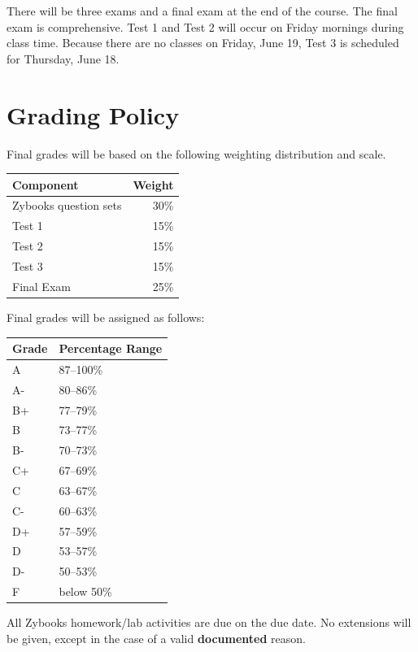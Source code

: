 \documentclass[11pt]{article}
\begin{document}
There will be three exams and a final exam at the end of the course. The final exam is comprehensive. Test 1 and Test 2 will occur on Friday mornings during class time. Because there are no classes on Friday, June 19, Test 3 is scheduled for Thursday, June 18.

\section{Grading Policy}

Final grades will be based on the following weighting distribution and scale.

\begin{center}
\begin{tabular}{@{}lr@{}}
\toprule
\textbf{Component} & \textbf{Weight} \\
\midrule
Zybooks question sets & 30\% \\
Test 1 & 15\% \\
Test 2 & 15\% \\
Test 3 & 15\% \\
Final Exam & 25\% \\
\bottomrule
\end{tabular}
\end{center}

Final grades will be assigned as follows:

\begin{center}
\begin{tabular}{@{}ll@{}}
\toprule
\textbf{Grade} & \textbf{Percentage Range} \\
\midrule
A & 87--100\% \\
A- & 80--86\% \\
B+ & 77--79\% \\
B & 73--77\% \\
B- & 70--73\% \\
C+ & 67--69\% \\
C & 63--67\% \\
C- & 60--63\% \\
D+ & 57--59\% \\
D & 53--57\% \\
D- & 50--53\% \\
F & below 50\% \\
\bottomrule
\end{tabular}
\end{center}

All Zybooks homework/lab activities are due on the due date. No extensions will be given, except in the case of a valid \textbf{documented} reason.
\end{document}
